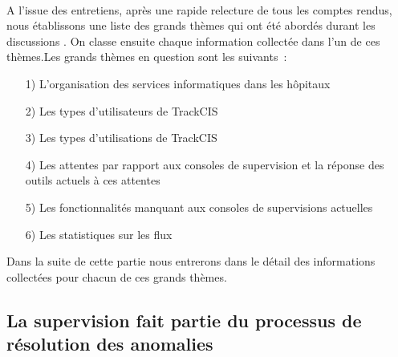 			\paragraph{}%
			A l'issue des entretiens, après une rapide relecture de tous les comptes
			rendus, nous établissons une liste des grands thèmes qui ont été
			abordés durant les discussions \citep{alami_les_2009}.
			On classe ensuite chaque information collectée dans l'un de ces
			thèmes.\newline Les grands thèmes en question sont les suivants~:
			\begin{itemize}
			  \item[1)] L’organisation des services informatiques dans les
			  hôpitaux
			  \item[2)] Les types d’utilisateurs de TrackCIS
			  \item[3)] Les types d’utilisations de TrackCIS
			  \item[4)] Les attentes par rapport aux consoles de supervision
			  et la réponse des outils actuels à ces attentes
			  \item[5)] Les fonctionnalités manquant aux consoles de
			  supervisions actuelles
			  \item[6)] Les statistiques sur les flux
			\end{itemize}
			Dans la suite de cette partie nous entrerons dans le détail des informations
			collectées pour chacun de ces grands thèmes.
			
		\subsection{La supervision fait partie du processus de résolution des
		anomalies}
